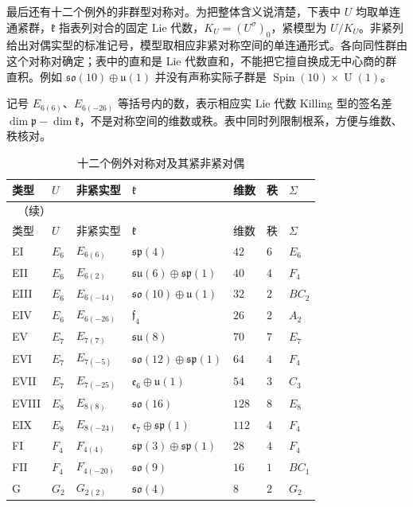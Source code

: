 最后还有十二个例外的非群型对称对。为把整体含义说清楚，下表中 \(U\) 均取单连通紧群，\(\mathfrak k\) 指表列对合的固定 Lie 代数，\(K_U=(U^\sigma)_0\)，紧模型为 \(U/K_U\)。非紧列给出对偶实型的标准记号，模型取相应非紧对称空间的单连通形式。各向同性群由这个对称对确定；表中的直和是 Lie 代数直和，不能把它擅自换成无中心商的群直积。例如 \(\mathfrak{so}(10)\oplus\mathfrak u(1)\) 并没有声称实际子群是 \(\operatorname{Spin}(10)\times\operatorname U(1)\)。

\ProseParagraphBreak

记号 \(E_{6(6)}\)、\(E_{6(-26)}\) 等括号内的数，表示相应实 Lie 代数 Killing 型的签名差 \(\dim\mathfrak p-\dim\mathfrak k\)，不是对称空间的维数或秩。表中同时列限制根系，方便与维数、秩核对。

\begingroup
\small
\setlength{\tabcolsep}{3pt}
\begin{longtable}{@{}p{}p{}p{}p{}p{}p{}p{}@{}}
	\caption{十二个例外对称对及其紧非紧对偶}\label{g3:tab:exceptional-symmetric-spaces}\\
	\toprule
	类型 & \(U\) & 非紧实型 & \(\mathfrak k\) & 维数 & 秩 & \(\Sigma\)\\
	\midrule
	\endfirsthead
	\multicolumn{7}{l}{\thetable\ （续）}\\
	\toprule
	类型 & \(U\) & 非紧实型 & \(\mathfrak k\) & 维数 & 秩 & \(\Sigma\)\\
	\midrule
	\endhead
	\bottomrule
	\endfoot
	EI & \(E_6\) & \(E_{6(6)}\) & \(\mathfrak{sp}(4)\) & \(42\) & \(6\) & \(E_6\)\\
	EII & \(E_6\) & \(E_{6(2)}\) & \(\mathfrak{su}(6)\oplus\mathfrak{sp}(1)\) & \(40\) & \(4\) & \(F_4\)\\
	EIII & \(E_6\) & \(E_{6(-14)}\) & \(\mathfrak{so}(10)\oplus\mathfrak u(1)\) & \(32\) & \(2\) & \(BC_2\)\\
	EIV & \(E_6\) & \(E_{6(-26)}\) & \(\mathfrak f_4\) & \(26\) & \(2\) & \(A_2\)\\
	EV & \(E_7\) & \(E_{7(7)}\) & \(\mathfrak{su}(8)\) & \(70\) & \(7\) & \(E_7\)\\
	EVI & \(E_7\) & \(E_{7(-5)}\) & \(\mathfrak{so}(12)\oplus\mathfrak{sp}(1)\) & \(64\) & \(4\) & \(F_4\)\\
	EVII & \(E_7\) & \(E_{7(-25)}\) & \(\mathfrak e_6\oplus\mathfrak u(1)\) & \(54\) & \(3\) & \(C_3\)\\
	EVIII & \(E_8\) & \(E_{8(8)}\) & \(\mathfrak{so}(16)\) & \(128\) & \(8\) & \(E_8\)\\
	EIX & \(E_8\) & \(E_{8(-24)}\) & \(\mathfrak e_7\oplus\mathfrak{sp}(1)\) & \(112\) & \(4\) & \(F_4\)\\
	FI & \(F_4\) & \(F_{4(4)}\) & \(\mathfrak{sp}(3)\oplus\mathfrak{sp}(1)\) & \(28\) & \(4\) & \(F_4\)\\
	FII & \(F_4\) & \(F_{4(-20)}\) & \(\mathfrak{so}(9)\) & \(16\) & \(1\) & \(BC_1\)\\
	G & \(G_2\) & \(G_{2(2)}\) & \(\mathfrak{so}(4)\) & \(8\) & \(2\) & \(G_2\)\\
\end{longtable}
\endgroup

